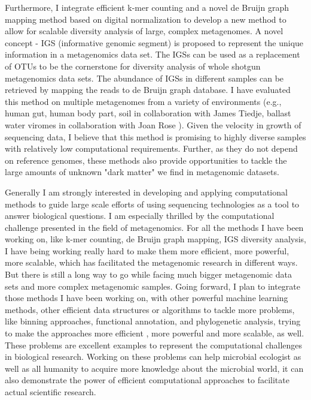 \documentclass[12pt]{article}
\theoremstyle{plain} \numberwithin{equation}{section}
\theoremstyle{definition}
\begin{document}
Furthermore, I integrate efficient k-mer counting and a novel de Bruijn graph mapping method based on digital normalization 
to develop a new method to allow for scalable diversity analysis of large, complex metagenomes.  A novel concept - 
IGS (informative genomic segment) is proposed to represent the 
unique information in a metagenomics data set. The IGSs can be used as a replacement of OTUs to be the cornerstone for 
diversity analysis of whole shotgun metagenomics data sets. The abundance of IGSs in different samples can be 
retrieved by mapping the reads to de Bruijn graph database. I have evaluated this method on multiple metagenomes from 
a variety of environments (e.g., human gut, human body part, soil in collaboration with James Tiedje, ballast water 
viromes in collaboration with Joan Rose ). Given the velocity in growth of sequencing data, I believe that this method is 
promising to highly diverse samples with relatively low computational requirements. Further, as they do not depend on 
reference genomes, these methods also provide opportunities to tackle the large amounts of unknown "dark matter" we 
find in metagenomic datasets.

Generally I am strongly interested in developing and applying computational methods to guide large scale efforts of using 
sequencing technologies as a tool to answer biological questions. I am especially thrilled by the computational challenge 
presented in the field of metagenomics. For all the methods I have been working on, like k-mer counting, de Bruijn graph 
mapping, IGS diversity analysis, I have being working really hard to make them more efficient, more powerful, more scalable, 
which has facilitated the metagenomic research in different ways. But there is still a long way to go while facing much bigger 
metagenomic data sets and more complex metagenomic samples.  Going forward, I plan to integrate those methods I have
 been working on, with other powerful machine learning methods, other efficient data structures or algorithms to tackle more 
 problems, like  binning approaches, functional annotation, and phylogenetic analysis,  trying to make the approaches more 
 efficient , more powerful and more scalable, as well.  These problems are excellent examples to represent the computational 
 challenges in biological research. Working on these problems can help microbial ecologist as well as all humanity to acquire 
 more knowledge about the microbial world, it can also demonstrate  the power of efficient computational approaches to 
 facilitate actual scientific research. 



\raisebox{1cm}
\end{document}
